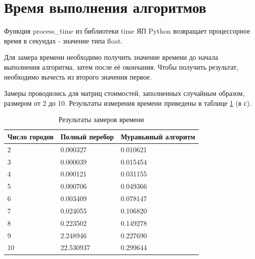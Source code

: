 \section{Время выполнения алгоритмов}

Функция process\_time из библиотеки time ЯП Python возвращает  процессорное время в секундах - значение типа float.

Для замера времени необходимо получить значение времени до начала выполнения алгоритма, затем после её окончания. Чтобы получить результат, необходимо вычесть из второго значения первое.

Замеры проводились для матриц стоимостей, заполненных случайным образом, размером от 2 до 10. Результаты измерения времени приведены в таблице \ref{tbl:time} (в с).

\begin{center}
\captionsetup{justification=raggedright,singlelinecheck=off}
\begin{longtable}[c]{|p{4cm}|p{4cm}|p{4cm}|}
\caption{Результаты замеров времени\label{tbl:time}}\\ \hline
   Число городов & Полный перебор & Муравьиный алгоритм \\ \hline
   2 &   0.000327 &   0.010621 \\ \hline
   3 &   0.000039 &   0.015454 \\ \hline
   4 &   0.000121 &   0.031155 \\ \hline
   5 &   0.000706 &   0.049366 \\ \hline
   6 &   0.003409 &   0.078147 \\ \hline
   7 &   0.024055 &   0.106820 \\ \hline
   8 &   0.223502 &   0.149278 \\ \hline
   9 &   2.248946 &   0.227690 \\ \hline
  10 &  22.530937 &   0.299644 \\ \hline
\end{longtable}
\end{center}

